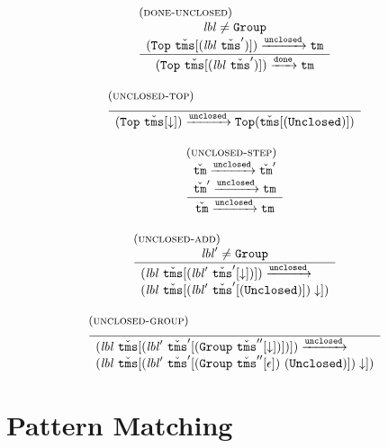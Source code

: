\documentclass{article}
\newcommand{\rulename}{\textsc}
\newcommand{\irule}[3]{\begin{array}{l}{~\small\mbox{(\rulename{#1})}}\\\;\frac{\begin{array}{c}#2\end{array}}{\begin{array}{l}#3\end{array}}\end{array}}
\newcommand{\labelFont}{\texttt}
\newcommand{\lbl}{\ensuremath{\mathit{lbl}}}
\newcommand{\Top}{\ensuremath{\labelFont{Top}}}
\newcommand{\Group}{\ensuremath{\labelFont{Group}}}
\newcommand{\Unclosed}{\ensuremath{\labelFont{Unclosed}}}
\newcommand{\tm}{\ensuremath{\mathtt{tm}}}
\newcommand{\tms}{\ensuremath{\mathtt{tms}}}
\newcommand{\Tm}{\ensuremath{\check{\tm}}}
\newcommand{\Tms}{\ensuremath{\check{\tms}}}
\newcommand{\unclosed}{\ensuremath{\texttt{unclosed}}}
\newcommand{\done}{\ensuremath{\texttt{done}}}
\newcommand{\cursor}{\ensuremath{\downarrow}}
\newcommand{\steps}[1]{\ensuremath{\xrightarrow{#1}}}
\begin{document}
\[
  \begin{array}{c}
    \irule{done-unclosed}{
    \lbl \neq \Group\\
    (\Top~\Tms[(\lbl~\Tms')]) \steps{\unclosed} \tm\\
    }{
    (\Top~\Tms[(\lbl~\Tms')]) \steps{\done} \tm
    }
    \\\\
    \irule{unclosed-top}{}{
    (\Top~\Tms[\cursor]) \steps{\unclosed} \Top(\Tms[(\Unclosed)])
    }
    \\\\
    \irule{unclosed-step}{
    \Tm \steps{\unclosed} \Tm'\\
    \Tm' \steps{\unclosed} \tm
    }{
    \Tm \steps{\unclosed} \tm
    }
    \\\\
    \irule{unclosed-add}{
    \lbl' \neq \Group
    }{
    (\lbl~\Tms[(\lbl'~\Tms'[\cursor])]) \steps{\unclosed}\\
    (\lbl~\Tms[(\lbl'~\Tms'[(\Unclosed)]) \cursor])
    }
    \\\\
    \irule{unclosed-group}{}{
    (\lbl~\Tms[(\lbl'~\Tms'[(\Group~\Tms''[\cursor])])]) \steps{\unclosed}\\
    (\lbl~\Tms[(\lbl'~\Tms'[(\Group~\Tms''[\epsilon]) ~ (\Unclosed)]) \cursor])
    }
  \end{array}
\]

\section{Pattern Matching}
\end{document}
